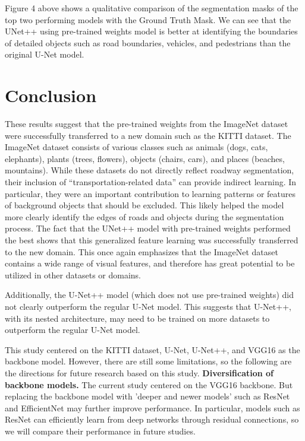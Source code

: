 \documentclass[10pt,twocolumn,letterpaper,final]{article} %
\begin{document}
Figure 4 above shows a qualitative comparison of the segmentation masks of the top two performing models with the Ground Truth Mask.  We can see that the UNet++ using pre-trained weights model is better at identifying the boundaries of detailed objects such as road boundaries, vehicles, and pedestrians than the original U-Net model.

\section{Conclusion}
\label{sec:intro}

These results suggest that the pre-trained weights from the ImageNet dataset were successfully transferred to a new domain such as the KITTI dataset.
The ImageNet dataset consists of various classes such as animals (dogs, cats, elephants), plants (trees, flowers), objects (chairs, cars), and places (beaches, mountains). While these datasets do not directly reflect roadway segmentation, their inclusion of “transportation-related data” can provide indirect learning. In particular, they were an important contribution to learning patterns or features of background objects that should be excluded. This likely helped the model more clearly identify the edges of roads and objects during the segmentation process.
The fact that the UNet++ model with pre-trained weights performed the best shows that this generalized feature learning was successfully transferred to the new domain.  This once again emphasizes that the ImageNet dataset contains a wide range of visual features, and therefore has great potential to be utilized in other datasets or domains.

Additionally, the U-Net++ model (which does not use pre-trained weights) did not clearly outperform the regular U-Net model. 
This suggests that U-Net++, with its nested architecture, may need to be trained on more datasets to outperform the regular U-Net model.

This study centered on the KITTI dataset, U-Net, U-Net++, and VGG16 as the backbone model. However, there are still some limitations, so the following are the directions for future research based on this study.
\textbf{Diversification of backbone models.
}The current study centered on the VGG16 backbone. But replacing the backbone model with 'deeper and newer models' such as ResNet and EfficientNet may further improve performance. In particular, models such as ResNet can efficiently learn from deep networks through residual connections, so we will compare their performance in future studies.
\end{document}
